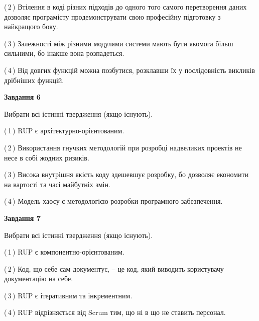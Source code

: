 \documentclass[10pt, ukrainian]{article}
\begin{document}
{\begin {large}
(\,2\,) Втілення в коді різних підходів до одного того самого перетворення даних дозволяє програмісту продемонструвати свою професійну підготовку з найкращого боку. %



(\,3\,) Залежності між різними модулями системи мають бути якомога більш сильними, бо інакше вона розпадеться. %



(\,4\,) Від довгих функцій можна позбутися, розклавши їх у послідовність викликів дрібніших функцій. %

\newpage

{\begin {center}\textbf{Завдання 6}\end {center}}\par
Вибрати всі істинні твердження (якщо існують).\par
\vspace{2mm}



(\,1\,) RUP є архітектурно-орієнтованим. %



(\,2\,) Використання гнучких методологій при розробці надвеликих проектів не несе в собі жодних ризиків. %



(\,3\,) Висока внутрішня якість коду здешевшує розробку, бо дозволяє економити на вартості та часі майбутніх змін. %



(\,4\,) Модель хаосу є методологією розробки програмного забезпечення. %


{\begin {center}\textbf{Завдання 7}\end {center}}\par
Вибрати всі істинні твердження (якщо існують).\par
\vspace{2mm}



(\,1\,) RUP є компонентно-орієнтованим. %



(\,2\,) Код, що себе сам документує, -- це код, який виводить користувачу документацію на себе. %



(\,3\,) RUP є ітеративним та інкрементним.%



(\,4\,) RUP відрізняється від Scrum тим, що ні в що не ставить персонал.%



\end{large}}
\end{document}
